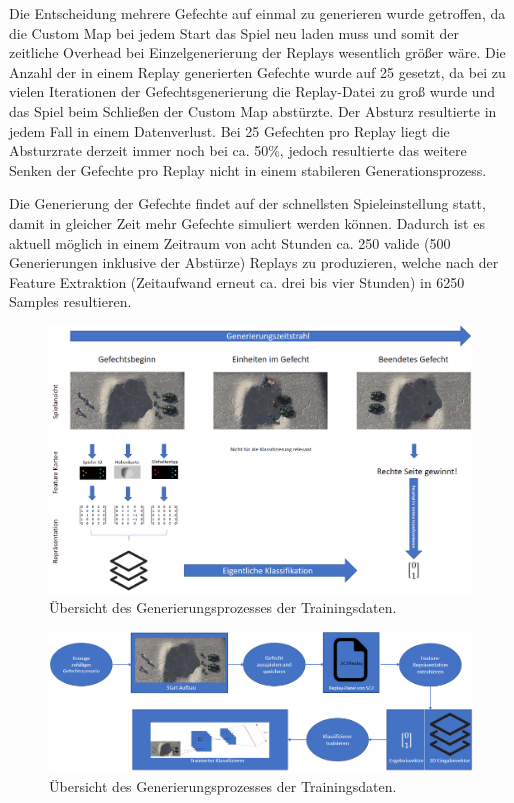 Die Entscheidung mehrere Gefechte auf einmal zu generieren wurde getroffen, da die Custom Map bei jedem Start das Spiel neu laden muss und somit der zeitliche Overhead bei Einzelgenerierung der Replays wesentlich größer wäre. Die Anzahl der in einem Replay generierten Gefechte wurde auf 25 gesetzt, da bei zu vielen Iterationen der Gefechtsgenerierung die Replay-Datei zu groß wurde und das Spiel beim Schließen der Custom Map abstürzte. Der Absturz resultierte in jedem Fall in einem Datenverlust. Bei 25 Gefechten pro Replay liegt die Absturzrate derzeit immer noch bei ca. 50\%, jedoch resultierte das weitere Senken der Gefechte pro Replay nicht in einem stabileren Generationsprozess. 

Die Generierung der Gefechte findet auf der schnellsten Spieleinstellung statt, damit in gleicher Zeit mehr Gefechte simuliert werden können. Dadurch ist es aktuell möglich in einem Zeitraum von acht Stunden ca. 250 valide (500 Generierungen inklusive der Abstürze) Replays zu produzieren, welche nach der Feature Extraktion (Zeitaufwand erneut ca. drei bis vier Stunden) in 6250 Samples resultieren. 

\newpage
\begin{figure}[H]
\thispagestyle{empty}
\centering
\includegraphics[angle=90,scale=0.6]{pictures/grafiken/Folie1}
\caption{Übersicht des Generierungsprozesses der Trainingsdaten.}
\label{fig:overview2}
\end{figure}

\begin{figure}[H]
\thispagestyle{empty}
\centering
\includegraphics[angle=90,scale=0.6]{pictures/grafiken/Folie2}
\caption{Übersicht des Generierungsprozesses der Trainingsdaten.}
\label{fig:overview1}
\end{figure}

